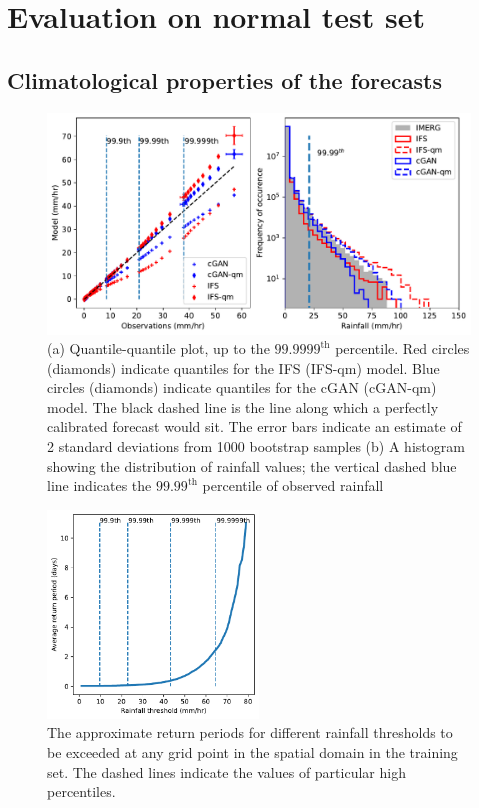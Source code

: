 \documentclass{article}
\begin{document}
\section{Evaluation on normal test set}



\subsection{Climatological properties of the forecasts}
\label{sec:climatologic}
\begin{figure}
     \centering
     \includegraphics[width=\textwidth]{images/q-q_hist_final-nologs_217600_all.pdf}

     \caption{(a) Quantile-quantile plot, up to the $99.9999^{\text{th}}$ percentile. Red circles (diamonds) indicate quantiles for the IFS (IFS-qm) model. Blue circles (diamonds) indicate quantiles for the cGAN (cGAN-qm) model. The black dashed line is the line along which a perfectly calibrated forecast would sit. The error bars indicate an estimate of 2 standard deviations from 1000 bootstrap samples (b) A histogram showing the distribution of rainfall values; the vertical dashed blue line indicates the $99.99^{\text{th}}$ percentile of observed rainfall }
     \label{fig:qq_hist}
\end{figure}

\begin{figure}
     \centering
     \includegraphics[width=0.5\textwidth]{images/return_periods_train.pdf}

    \caption{The approximate return periods for different rainfall thresholds to be exceeded at any grid point in the spatial domain in the training set. The dashed lines indicate the values of particular high percentiles.}
    \label{fig:return}
\end{figure}
\end{document}
